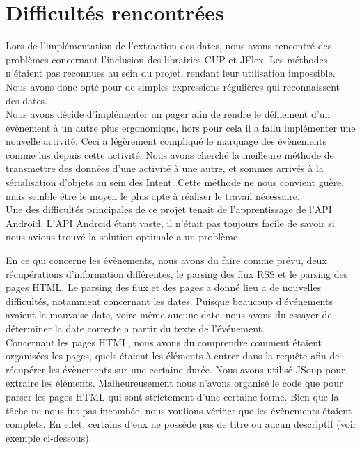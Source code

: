 \chapter{Difficultés rencontrées}

Lors de l’implémentation de l’extraction des dates, nous avons rencontré des problèmes concernant l’inclusion des librairies CUP et JFlex. Les méthodes n’étaient pas reconnues au sein du projet, rendant leur utilisation impossible.
Nous avons donc opté pour de simples expressions régulières qui reconnaissent des dates. \\

Nous avons décide d’implémenter un pager afin de rendre le défilement d’un évènement à un autre plus ergonomique, hors pour cela il a fallu implémenter une nouvelle activité. Ceci a légèrement compliqué le marquage des évènements comme lus depuis cette activité. Nous avons cherché la meilleure méthode de transmettre des données d’une activité à une autre, et sommes arrivés à la sérialisation d’objets au sein des Intent. Cette méthode ne nous convient guère, mais semble être le moyen le plus apte à réaliser le travail nécessaire. \\

Une des difficultés principales de ce projet tenait de l’apprentissage de l’API Android. L’API Android étant vaste, il n’était pas toujours facile de savoir si nous avions trouvé la solution optimale a un problème.


En ce qui concerne les évènements, nous avons du faire comme prévu, deux récupérations d’information différentes, le parsing des flux RSS et le parsing des pages HTML.
Le parsing des flux et des pages a donné lieu a de nouvelles difficultés, notamment concernant les dates. Puisque beaucoup d'événements avaient la mauvaise date, voire même aucune date, nous avons du essayer de déterminer la date correcte a partir du texte de l'événement. \\


Concernant les pages HTML, nous avons du comprendre comment étaient organisées les pages, quels étaient les éléments à entrer dans la requête afin de récupérer les évènements sur une certaine durée. Nous avons utilisé JSoup pour extraire les éléments. Malheureusement nous n’avons organisé le code que pour parser les pages HTML qui sont strictement d’une certaine forme.
Bien que la tâche ne nous fut pas incombée, nous voulions vérifier que les évènements étaient complets. En effet, certains d’eux ne possède pas de titre ou aucun descriptif (voir exemple ci-dessous).

